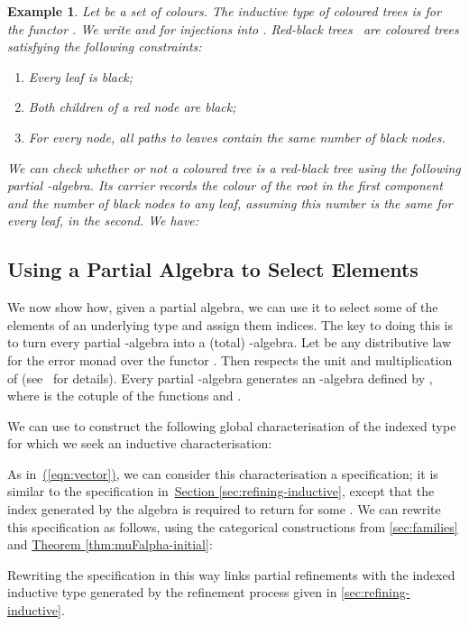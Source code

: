 \documentclass{LMCS}
\newtheorem{eorollary}{Example}
\newcommand{\parenref}[1]{\hyperref[#1]{(\ref*{#1})}}
\newcommand{\thmref}[1]{\hyperref[#1]{Theorem \ref*{#1}}}
\begin{document}
\begin{eorollary}
  Let  be a set of colours.
  The inductive type of coloured trees is  for
  the functor .  We write  and  for injections into
  . Red-black trees~\cite{cormen01intro} are
  coloured trees satisfying the following constraints:
\begin{enumerate}
\item Every leaf is black;
\item Both children of a red node are black;
\item For every node, all paths to leaves contain the same number of
  black nodes.
\end{enumerate}
We can check whether or not a coloured tree is a red-black tree using
the following partial -algebra. Its carrier
 records the colour of the root in the
first component and the number of black nodes to any leaf, assuming
this number is the same for every leaf, in the second. We have:

\end{eorollary}

\subsection{Using a Partial Algebra to Select Elements}

We now show how, given a partial algebra, we can use it to select some
of the elements of an underlying type and assign them indices. The key
to doing this is to turn every partial -algebra into a (total)
-algebra. Let  be any
distributive law for the error monad  over the functor . Then
 respects the unit and multiplication of 
(see~\cite{barr83toposes} for details). Every partial -algebra
 generates an -algebra  defined by , where  is the cotuple of the
functions  and .

We can use  to construct the following global
characterisation of the indexed type for which we seek an inductive
characterisation:

As in~\parenref{eqn:vector}, we can consider this characterisation a
specification; it is similar to the specification
in~\hyperref[sec:refining-inductive]{Section
  \ref*{sec:refining-inductive}}, except that the index generated by
the algebra  is required to return  for
some . We can rewrite this specification as follows, using
the categorical constructions from \autoref{sec:families} and
\thmref{thm:muFalpha-initial}:

Rewriting the specification in this way links partial refinements with
the indexed inductive type generated by the refinement process given
in \autoref{sec:refining-inductive}.
\end{document}
